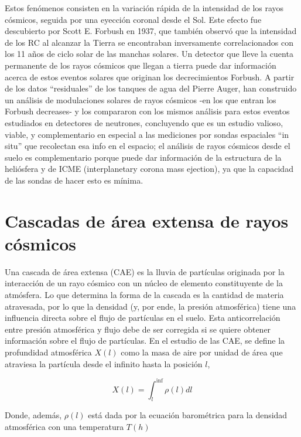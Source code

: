 \documentclass{book}
\begin{document}
Estos fen\'omenos consisten en la variaci\'on r\'apida de la intensidad de los rayos c\'osmicos, seguida por una eyecci\'on coronal desde el Sol. Este efecto fue descubierto por Scott E. Forbush en 1937, que tambi\'en observ\'o que la intensidad de los RC al alcanzar la Tierra se encontraban inversamente correlacionados con los 11 a\~nos de ciclo solar de las manchas solares. Un detector que lleve la cuenta permanente de los rayos c\'osmicos que llegan a tierra puede dar informaci\'on acerca de estos eventos solares que originan los decrecimientos Forbush. A partir de los datos “residuales” de los tanques de agua del Pierre Auger, han construido un an\'alisis de modulaciones solares de rayos c\'osmicos -en los que entran los Forbush decreases- y los compararon con los mismos an\'alisis para estos eventos estudiados en detectores de neutrones, concluyendo que es un estudio valioso, viable, y complementario en especial a las mediciones por sondas espaciales “in situ” que recolectan esa info en el espacio; el an\'alisis de rayos c\'osmicos desde el suelo es complementario porque puede dar informaci\'on de la estructura de la heli\'osfera y de ICME (interplanetary corona mass ejection), ya que la capacidad de las sondas de hacer esto es m\'inima. \citep{VILLASENOR}

\section{Cascadas de \'area extensa de rayos c\'osmicos}
Una cascada de \'area extensa (CAE) es la lluvia de part\'iculas originada por la interacci\'on de un rayo c\'osmico con un n\'ucleo de elemento constituyente de la atm\'osfera. Lo que determina la forma de la cascada es la cantidad de materia atravesada, por lo que la densidad (y, por ende, la presi\'on atmosf\'erica) tiene una influencia directa sobre el flujo de part\'iculas en el suelo. Esta anticorrelaci\'on entre presi\'on atmosf\'erica y flujo debe de ser corregida si se quiere obtener informaci\'on sobre el flujo de part\'iculas. En el estudio de las CAE, se define la profundidad atmosf\'erica $X(l)$ como la masa de aire por unidad de \'area que atraviesa la part\'icula desde el infinito hasta la posici\'on $l$,

\begin{equation}
X(l)=\int_{l}^{\inf}\rho(l)dl
\end{equation}

Donde, adem\'as, $\rho(l)$ est\'a dada por la ecuaci\'on barom\'etrica para la densidad atmosf\'erica con una temperatura $T(h)$
\end{document}
